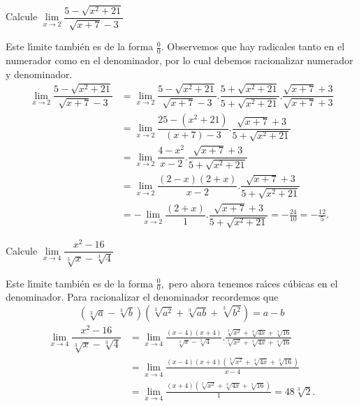 \begin{example}
\label{ejemplorelcap3}Calcule $\lim\limits_{x\rightarrow2}\dfrac{5-\sqrt
{x^{2}+21}}{\sqrt{x+7}-3}$
\end{example}

\begin{sol}
Este l\'{\i}mite tambi\'{e}n es de la forma $\frac{0}{0}$. Observemos que hay
radicales tanto en el numerador como en el denominador, por lo cual debemos
racionalizar numerador y denominador.%
\begin{align*}
\lim\limits_{x\rightarrow2}\dfrac{5-\sqrt{x^{2}+21}}{\sqrt{x+7}-3}  &
=\lim\limits_{x\rightarrow2}\dfrac{5-\sqrt{x^{2}+21}}{\sqrt{x+7}-3}%
.\dfrac{5+\sqrt{x^{2}+21}}{5+\sqrt{x^{2}+21}}.\dfrac{\sqrt{x+7}+3}{\sqrt
{x+7}+3}\\
&  =\lim\limits_{x\rightarrow2}\dfrac{25-(x^{2}+21)}{(x+7)-3}.\dfrac
{\sqrt{x+7}+3}{5+\sqrt{x^{2}+21}}\\
&  =\lim\limits_{x\rightarrow2}\dfrac{4-x^{2}}{x-2}.\dfrac{\sqrt{x+7}%
+3}{5+\sqrt{x^{2}+21}}\\
&  =\lim\limits_{x\rightarrow2}\dfrac{(2-x)(2+x)}{x-2}.\dfrac{\sqrt{x+7}%
+3}{5+\sqrt{x^{2}+21}}\\
&  =-\lim\limits_{x\rightarrow2}\dfrac{(2+x)}{1}.\dfrac{\sqrt{x+7}+3}%
{5+\sqrt{x^{2}+21}}=-\frac{24}{10}=-\frac{12}{5}.
\end{align*}

\end{sol}

\begin{example}
Calcule $\lim\limits_{x\rightarrow4}\dfrac{x^{2}-16}{\sqrt[3]{x}-\sqrt[3]{4}}$
\end{example}

\begin{sol}
Este l\'{\i}mite tambi\'{e}n es de la forma $\frac{0}{0},$ pero ahora tenemos
ra\'{\i}ces c\'{u}bicas en el denominador. Para racionalizar el denominador
recordemos que%
\[
(\sqrt[3]{a}-\sqrt[3]{b})(\sqrt[3]{a^{2}}+\sqrt[3]{ab}+\sqrt[3]{b^{2}})=a-b
\]%
\begin{align*}
\lim\limits_{x\rightarrow4}\dfrac{x^{2}-16}{\sqrt[3]{x}-\sqrt[3]{4}}  &
=\lim\limits_{x\rightarrow4}\frac{(x-4)(x+4)}{\sqrt[3]{x}-\sqrt[3]{4}}%
.\frac{\sqrt[3]{x^{2}}+\sqrt[3]{4x}+\sqrt[3]{16}}{\sqrt[3]{x^{2}}+\sqrt[3]%
{4x}+\sqrt[3]{16}}\\
&  =\lim\limits_{x\rightarrow4}\frac{(x-4)(x+4)(\sqrt[3]{x^{2}}+\sqrt[3]%
{4x}+\sqrt[3]{16})}{x-4}\\
&  =\lim\limits_{x\rightarrow4}\frac{(x+4)(\sqrt[3]{x^{2}}+\sqrt[3]%
{4x}+\sqrt[3]{16})}{1}=48\sqrt[3]{2}.
\end{align*}

\end{sol}


